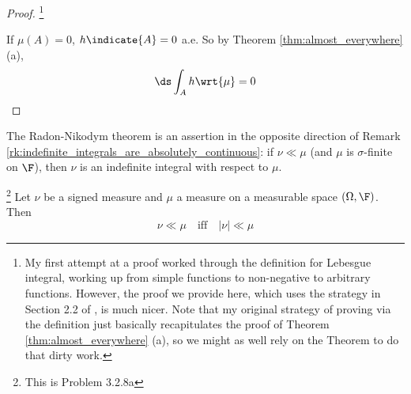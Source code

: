 \documentclass{article} %
\newif\ifActive
\newcommand{\dmu}{\wrt{\mu}}
\begin{document}
\begin{proof}\footnote{My first attempt at a proof worked through the definition for Lebesgue integral, working up from simple functions to non-negative to arbitrary functions.  However, the proof we provide here, which uses the strategy in Section 2.2 of \cite{ash2000probability}, is much nicer.  Note that my original strategy of proving via the definition just basically recapitulates the proof of Theorem \ref{thm:almost_everywhere} (a), so we might as well rely on the Theorem to do that dirty work.}

\ifActive
\textbf{Workshop Exercise: Prove this.}
\else 
	If $\mu(A) =0$, $h \indicate{A} = 0$ a.e.  So by Theorem \ref{thm:almost_everywhere} (a), 
	\[ \ds\int_A h \dmu = 0 \]
\fi 
\end{proof}

\begin{remark}{}
The Radon-Nikodym theorem is an assertion in the opposite direction of Remark \ref{rk:indefinite_integrals_are_absolutely_continuous}:  if $\nu \ll \mu$ (and $\mu$ is $\sigma$-finite on $\F$), then $\nu$ is an indefinite integral with respect  to $\mu$. 
\end{remark}


\begin{remark}{}\footnote{This is \cite{folland1999real} Problem 3.2.8a}
Let $\nu$ be a signed measure and $\mu$ a measure on a measurable space $(\Omega, \F)$.  Then 
\[ \nu \ll \mu \quad \text{iff} \quad |\nu| \ll \mu \]
\label{rk:signed_measure_is_absolutely_continuous_iff_its_total_variation_is_absolutely_continuous}
\end{remark}
\end{document}
